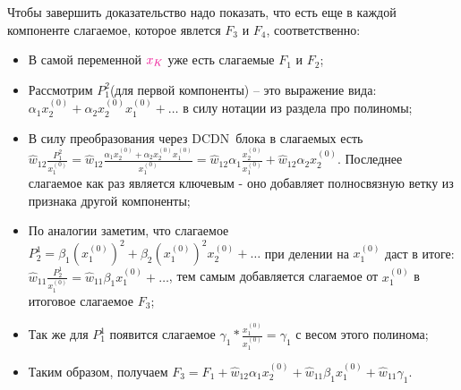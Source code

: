 \documentclass{report}
\begin{document}
\par Чтобы завершить доказательство надо показать, что есть еще в каждой компоненте слагаемое, которое явлется $F_3$ и $F_4$, соответственно:
\begin{itemize}
    \item В самой переменной $\color{magenta}x_K\color{black}$ уже есть слагаемые $F_1$ и $F_2$;
    \item Рассмотрим $P_1^2$(для первой компоненты) -- это выражение вида: \\
    $\alpha_1 x_2^{(0)} + \alpha_2 x_2^{(0)}x_1^{(0)}+\dots$ в силу нотации из раздела  про полиномы;
    \item В силу преобразования через \color{Violet}DCDN\color{black}\ блока в слагаемых есть \\
    $\widehat{w}_{12}\frac{P_{1}^2}{x_1^{(0)}} = \widehat{w}_{12}\frac{\alpha_1 x_2^{(0)} + \alpha_2 x_2^{(0)}x_1^{(0)}}{x_1^{(0)}} = \widehat{w}_{12}\alpha_1\frac{x_2^{(0)}}{x_1^{(0)}} + \widehat{w}_{12}\alpha_2x_2^{(0)}$. 
    Последнее слагаемое как раз является ключевым - оно добавляет полносвязную ветку из признака другой компоненты;
    \item По аналогии заметим, что слагаемое $P_2^1 = \beta_1 \left(x_1^{(0)}\right)^2 + \beta_2 \left(x_1^{(0)}\right)^2x_2^{(0)} + \dots$ при делении на $x_1^{(0)}$ даст в итоге: \\
    $\widehat{w}_{11}\frac{P_{2}^1}{x_1^{(0)}} = \widehat{w}_{11}\beta_1x_1^{(0)} + \dots$, тем самым добавляется слагаемое от $x_1^{(0)}$ в итоговое слагаемое $F_3$;
    \item Так же для $P_1^1$ появится слагаемое $\gamma_1 * \frac{x_1^{(0)}}{x_1^{(0)}} = \gamma_1$ с весом этого полинома;
    \item Таким образом, получаем $F_3 = F_1 + \widehat{w}_{12}\alpha_1 x_2^{(0)} + \widehat{w}_{11}\beta_1x_1^{(0)} + \widehat{w}_{11}\gamma_1$.
\end{itemize}
\end{document}
